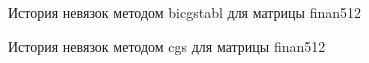 \begin{figure}[H]
    \renewcommand{\figurename}{Рисунок}
    \caption{История невязок методом bicgstabl для матрицы finan512}
    \label{fig:image_35}
\end{figure}

\begin{figure}[H]
    \renewcommand{\figurename}{Рисунок}
    \caption{История невязок методом cgs для матрицы finan512}
    \label{fig:image_36}
\end{figure}

